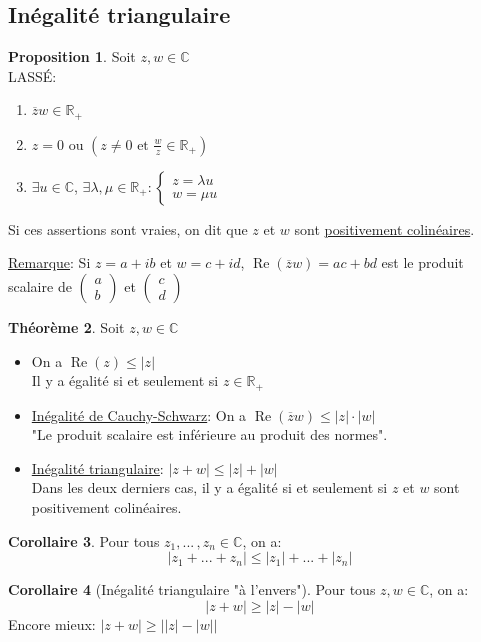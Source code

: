 \documentclass[10pt,a4paper]{article}
\theoremstyle{definition}
\newtheorem{proposition}{Proposition}[section]
\newtheorem{theorem}[proposition]{Théorème}
\newtheorem{corollaire}[proposition]{Corollaire}
\DeclareMathOperator{\re}{Re}
\begin{document}
\subsection{Inégalité triangulaire}
\begin{proposition}
Soit $z, w \in \mathbb{C}$ \\
LASSÉ:
\begin{enumerate}
\item $\overline{z} w \in \mathbb{R}_+$
\item $z = 0$ ou $(z \neq 0 \text{ et } \frac{w}{z} \in \mathbb{R}_+)$
\item $\exists u \in \mathbb{C}$, $\exists \lambda, \mu \in \mathbb{R}_+: \begin{cases}
z = \lambda u \\
w = \mu u
\end{cases}$
\end{enumerate}
Si ces assertions sont vraies, on dit que $z$ et $w$ sont \uline{positivement colinéaires}.
\end{proposition}
\noindent \uline{Remarque}: Si $z = a + ib$ et $w = c + id$, $\re(\overline{z}w) = ac + bd$ est le produit scalaire de $\begin{pmatrix}
a \\
b
\end{pmatrix}$ et $\begin{pmatrix}
c \\
d
\end{pmatrix}$
\begin{theorem}
Soit $z, w \in \mathbb{C}$
\begin{itemize}
\item On a $\re(z) \leq |z|$ \\
Il y a égalité si et seulement si $z \in \mathbb{R}_+$
\item \uline{Inégalité de Cauchy-Schwarz}: On a $\re(\overline{z} w) \leq |z| \cdot |w|$ \\
"Le produit scalaire est inférieure au produit des normes".
\item \uline{Inégalité triangulaire}: $\left| z + w \right| \leq |z| + |w|$ \\
Dans les deux derniers cas, il y a égalité si et seulement si $z$ et $w$ sont positivement colinéaires.
\end{itemize}
\end{theorem}
\begin{corollaire}
Pour tous $z_1, ...\,, z_n \in \mathbb{C}$, on a:
\[\left|z_1 + ... + z_n\right| \leq |z_1| + ... + |z_n|\]
\end{corollaire}
\begin{corollaire}[Inégalité triangulaire "à l'envers"]
Pour tous $z, w \in \mathbb{C}$, on a:
\[ \left|z + w\right| \geq |z| - |w| \]
Encore mieux: $\left| z + w \right| \geq \left| |z| - |w| \right|$
\end{corollaire}
\end{document}
